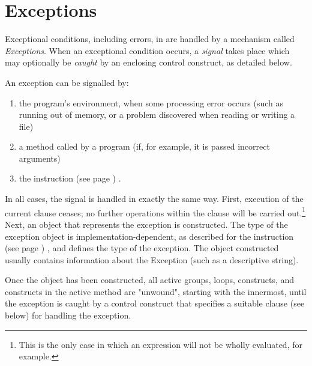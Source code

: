 \section{Exceptions}\label{refexcep}
 
Exceptional conditions, including errors, in \nr{} are handled by a
mechanism called \emph{Exceptions}.
When an exceptional condition occurs, a \emph{signal} takes place
which may optionally be \emph{caught} by an enclosing control
construct, as detailed below.
 
An exception can be signalled by:
\begin{enumerate}
\item the program's environment, when some processing error occurs (such
as running out of memory, or a problem discovered when reading or
writing a file)
\item a method called by a \nr{} program (if, for example, it is passed
incorrect arguments)
\item the   instruction (see page \pageref{refsignal}) .
\end{enumerate}
In all cases, the signal is handled in exactly the same way.
First, execution of the current clause ceases; no further operations
within the clause will be carried out.\footnote{
This is the only case in which an expression will not be wholly
evaluated, for example.
}
Next, an object that represents the exception is constructed.  The type
of the exception object is implementation-dependent, as described for
the   instruction (see page \pageref{refsignal}) , and defines the
type of the exception.  The object constructed usually contains
information about the Exception (such as a descriptive string).
 
Once the object has been constructed, all active  groups,
 loops,  constructs, and 
constructs in the active method are "unwound", starting with the
innermost, until the exception is caught by a control construct that
specifies a suitable  clause (see below) for handling the
exception.
 
